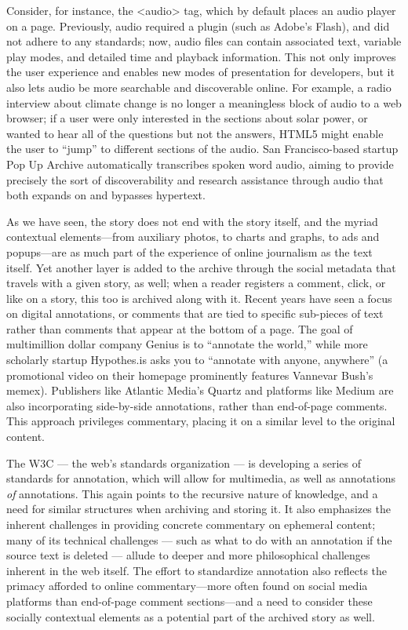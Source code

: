 Consider, for instance, the <audio> tag, which by default places an audio player on a page. Previously, audio required a plugin (such as Adobe's Flash), and did not adhere to any standards; now, audio files can contain associated text, variable play modes, and detailed time and playback information. This not only improves the user experience and enables new modes of presentation for developers, but it also lets audio be more searchable and discoverable online. For example, a radio interview about climate change is no longer a meaningless block of audio to a web browser; if a user were only interested in the sections about solar power, or wanted to hear all of the questions but not the answers, HTML5 might enable the user to ``jump'' to different sections of the audio. San Francisco-based startup Pop Up Archive automatically transcribes spoken word audio, aiming to provide precisely the sort of discoverability and research assistance through audio that both expands on and bypasses hypertext.

As we have seen, the story does not end with the story itself, and the myriad contextual elements---from auxiliary photos, to charts and graphs, to ads and popups---are as much part of the experience of online journalism as the text itself. Yet another layer is added to the archive through the social metadata that travels with a given story, as well; when a reader registers a comment, click, or like on a story, this too is archived along with it. Recent years have seen a focus on digital annotations, or comments that are tied to specific sub-pieces of text rather than comments that appear at the bottom of a page. The goal of multimillion dollar company Genius is to ``annotate the world,'' while more scholarly startup Hypothes.is asks you to ``annotate with anyone, anywhere'' (a promotional video on their homepage prominently features Vannevar Bush's memex). Publishers like Atlantic Media's Quartz and platforms like Medium are also incorporating side-by-side annotations, rather than end-of-page comments. This approach privileges commentary, placing it on a similar level to the original content.

The W3C --- the web's standards organization --- is developing a series of standards for annotation, which will allow for multimedia, as well as annotations \emph{of} annotations. This again points to the recursive nature of knowledge, and a need for similar structures when archiving and storing it. It also emphasizes the inherent challenges in providing concrete commentary on ephemeral content; many of its technical challenges --- such as what to do with an annotation if the source text is deleted --- allude to deeper and more philosophical challenges inherent in the web itself. The effort to standardize annotation also reflects the primacy afforded to online commentary---more often found on social media platforms than end-of-page comment sections---and a need to consider these socially contextual elements as a potential part of the archived story as well.


